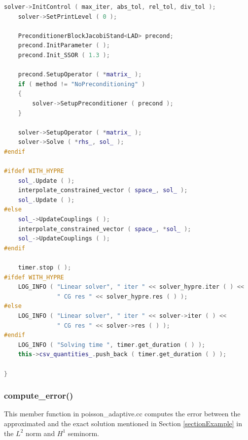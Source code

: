 \documentclass[a4paper, 11pt, twoside]{article}
\begin{document}
\begin{lstlisting}[language=C++, basicstyle={\footnotesize, \ttfamily}, keywordstyle=\color{blue}, numbers=none, tabsize=4]
    solver->InitControl ( max_iter, abs_tol, rel_tol, div_tol );
    solver->SetPrintLevel ( 0 );

    PreconditionerBlockJacobiStand<LAD> precond;
    precond.InitParameter ( );
    precond.Init_SSOR ( 1.3 );

    precond.SetupOperator ( *matrix_ );
    if ( method != "NoPreconditioning" )
    {
        solver->SetupPreconditioner ( precond );
    }

    solver->SetupOperator ( *matrix_ );
    solver->Solve ( *rhs_, sol_ );
#endif

#ifdef WITH_HYPRE
    sol_.Update ( );
    interpolate_constrained_vector ( space_, sol_ );
    sol_.Update ( );
#else
    sol_->UpdateCouplings ( );
    interpolate_constrained_vector ( space_, *sol_ );
    sol_->UpdateCouplings ( );
#endif

    timer.stop ( );
#ifdef WITH_HYPRE
    LOG_INFO ( "Linear solver", " iter " << solver_hypre.iter ( ) << 
               " CG res " << solver_hypre.res ( ) );
#else
    LOG_INFO ( "Linear solver", " iter " << solver->iter ( ) << 
               " CG res " << solver->res ( ) );
#endif
    LOG_INFO ( "Solving time ", timer.get_duration ( ) );
    this->csv_quantities_.push_back ( timer.get_duration ( ) );

}
\end{lstlisting}

\subsubsection{compute\_error()}\label{memberComputeError}
This member function in poisson\_adaptive.cc computes the error between the approximated and the exact solution mentioned in Section \ref{sectionExample} in the $L^2$ norm and $H^1$ seminorm.
\end{document}

